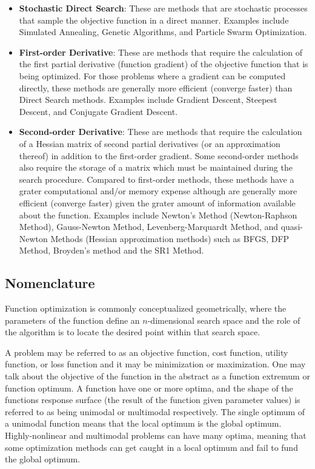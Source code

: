 \begin{bibunit}
\begin{itemize}
	\item \textbf{Stochastic Direct Search}: These are methods that are stochastic processes that sample the objective function in a direct manner. Examples include Simulated Annealing, Genetic Algorithms, and Particle Swarm Optimization.

	\item \textbf{First-order Derivative}: These are methods that require the calculation of the first partial derivative (function gradient) of the objective function that is being optimized. For those problems where a gradient can be computed directly, these methods are generally more efficient (converge faster) than Direct Search methods. Examples include Gradient Descent, Steepest Descent, and Conjugate Gradient Descent.

	\item \textbf{Second-order Derivative}: These are methods that require the calculation of a Hessian matrix of second partial derivatives (or an approximation thereof) in addition to the first-order gradient. Some second-order methods also require the storage of a matrix which must be maintained during the search procedure. Compared to first-order methods, these methods have a grater computational and/or memory expense although are generally more efficient (converge faster) given the grater amount of information available about the function. Examples include Newton's Method (Newton-Raphson Method), Gauss-Newton Method, Levenberg-Marquardt Method, and quasi-Newton Methods (Hessian approximation methods) such as BFGS, DFP Method, Broyden's method and the SR1 Method.
\end{itemize}

\subsection{Nomenclature}
Function optimization is commonly conceptualized geometrically, where the parameters of the function define an $n$-dimensional search space and the role of the algorithm is to locate the desired point within that search space.

A problem may be referred to as an objective function, cost function, utility function, or loss function and it may be minimization or maximization. One may talk about the objective of the function in the abstract as a function extremum or function optimum. 
A function have one or more optima, and the shape of the functions response surface (the result of the function given parameter values) is referred to as being unimodal or multimodal respectively. The single optimum of a unimodal function means that the local optimum is the global optimum. Highly-nonlinear and multimodal problems can have many optima, meaning that some optimization methods can get caught in a local optimum and fail to fund the global optimum.


\end{bibunit}
